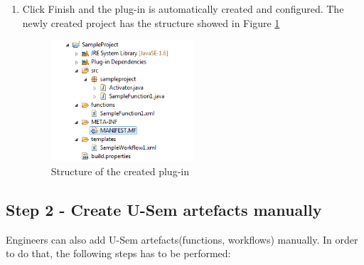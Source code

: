 \documentclass[a4paper, notitlepage]{article}
\begin{document}
\begin{enumerate}
		\item Click Finish and the plug-in is automatically created and configured. The newly created project has the structure showed in Figure \ref{struct}
		
\begin{figure}
  \centering
    \includegraphics[width=0.5\textwidth]{fileStruct.png}
    \caption{Structure of the created plug-in}
    \label{struct}
\end{figure}

	\end{enumerate}

\subsection{Step 2 - Create U-Sem artefacts manually}
Engineers can also add U-Sem artefacts(functions, workflows) manually. In order to do that, the following steps has to be performed:
\end{document}

